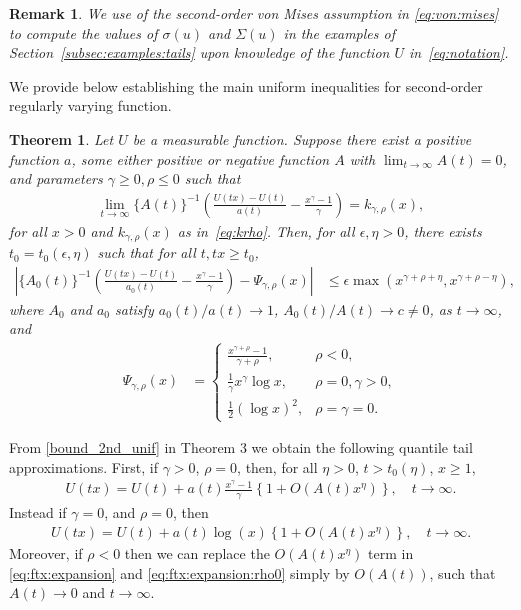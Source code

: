 \documentclass{statsoc}
\newtheorem{theorem}{Theorem}
\newtheorem{remark}{Remark}
\theoremstyle{break}
\begin{document}
\begin{remark}
We use of the second-order von Mises assumption in \eqref{eq:von:mises} to compute the values of  $\sigma(u)$ and $\Sigma(u)$ in the examples of Section~\ref{subsec:examples:tails} upon knowledge of the function $U$ in~\eqref{eq:notation}.
\end{remark}

We provide below \cite[Theorem 2.3.6]{dehaan:ferreira:2006} establishing the main uniform inequalities for second-order regularly varying function.

\begin{theorem}\label{eq:thm:second:order:bounds}
	Let $U$ be a measurable function. Suppose there exist a positive function $a$, some  either positive or negative function $A$ with $\lim_{t \to \infty} A(t) = 0$, and parameters $\gamma \geq  0, \rho \leq 0$ such that 
	\begin{align*}
		\lim_{t \to \infty} 
		\{A(t)\}^{-1} 
		\left( 
		\frac{U(tx) - U(t)}{a(t)} - \frac{x^\gamma - 1}{\gamma}
		\right) = k_{\gamma,\rho}(x),
	\end{align*}
	for all $x > 0$ and $k_{\gamma,\rho}(x)$ as in~\eqref{eq:krho}.
	Then, for all $\epsilon, \eta >0$, there exists $t_0 = t_0(\epsilon,\eta)$ such that for all $t, tx \geq t_0$,
	\begin{align}\label{bound_2nd_unif}
		\left|\{A_0(t)\}^{-1} 
		\left( 
		\frac{U(tx) - U(t)}{a_0(t)} - \frac{x^\gamma - 1}{\gamma}
		\right) - \Psi_{\gamma,\rho}(x)\right| 
		&\leq \epsilon \max(x^{\gamma + \rho + {\eta}}, x^{\gamma+\rho-{\eta}}),
	\end{align}
	where $A_0$ and $a_0$ satisfy $a_0(t)/a(t) \to 1$, $A_0(t)/A(t) \to c \not = 0$, as $t \to \infty$, and 
	\begin{align*} \Psi_{\gamma,\rho}(x) &=
		\begin{cases} 
			\frac{ x^{\gamma+\rho} - 1}{\gamma + \rho}, & \rho < 0 ,\\
			\frac{1}{\gamma}
			x^{\gamma}\log x, & \rho = 0, \gamma > 	0 , \\
			\frac{1}{2} (\log x)^2, & \rho = \gamma = 0.
		\end{cases}
	\end{align*}
\end{theorem}


From \eqref{bound_2nd_unif} in Theorem 3
we obtain the following quantile tail approximations.   
First, if $\gamma > 0$, $\rho  = 0$, then, for all $\eta>0$, $t > t_0(\eta)$, $x\geq 1$,
\begin{align}\label{eq:ftx:expansion}
	U(tx) = U(t) + a(t)\frac{x^\gamma -1}{\gamma} \left\{
	1+ O(A(t)x^\eta )\right\}, \quad t \to \infty.
\end{align}
Instead if $\gamma = 0$, and $\rho = 0$, then
\begin{align}\label{eq:ftx:expansion:rho0}
	U(tx) = U(t) + a(t)\log(x)\left\{1+ O(A(t)x^\eta )\right\}, \quad t \to \infty.
\end{align}
Moreover, if $\rho < 0$ then we can replace the $O(A(t)x^\eta)$ term in \eqref{eq:ftx:expansion} and \eqref{eq:ftx:expansion:rho0} simply by $O(A(t))$, such that $A(t) \to 0$ and $t \to \infty$.  
\end{document}
